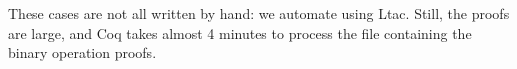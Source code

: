 \documentclass{puthesis}
\begin{document}
These cases are not all written by hand: we automate using Ltac.  Still, the
proofs are large, and Coq takes almost 4 minutes to process the file containing the binary
operation proofs.





\end{document}
